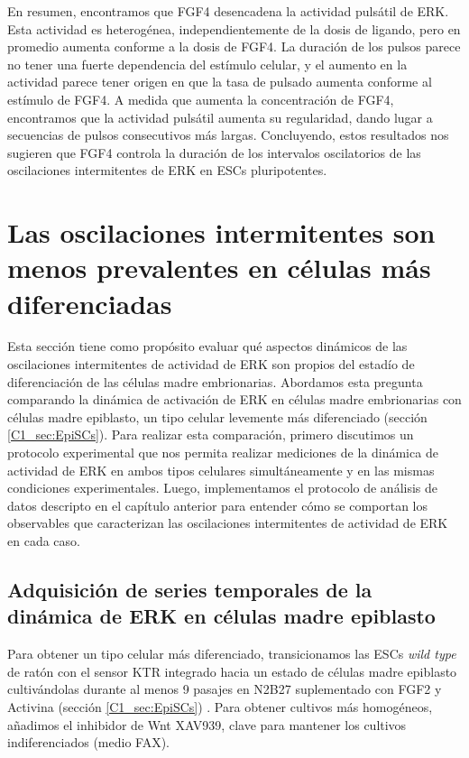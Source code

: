 \documentclass[./main.tex]{subfiles}
\begin{document}
En resumen, encontramos que FGF4 desencadena la actividad pulsátil de ERK. Esta actividad es heterogénea, independientemente de la dosis de ligando, pero en promedio aumenta conforme a la dosis de FGF4. La duración de los pulsos parece no tener una fuerte dependencia del estímulo celular, y el aumento en la actividad parece tener origen en que la tasa de pulsado aumenta conforme al estímulo de FGF4. A medida que aumenta la concentración de FGF4, encontramos que la actividad pulsátil aumenta su regularidad, dando lugar a secuencias de pulsos consecutivos más largas. Concluyendo, estos resultados nos sugieren que FGF4 controla la duración de los intervalos oscilatorios de las oscilaciones intermitentes de ERK en ESCs pluripotentes.


\section{Las oscilaciones intermitentes son menos prevalentes en células más diferenciadas}

Esta sección tiene como propósito evaluar qué aspectos dinámicos de las oscilaciones intermitentes de actividad de ERK son propios del estadío de diferenciación de las células madre embrionarias. Abordamos esta pregunta comparando la dinámica de activación de ERK en células madre embrionarias con células madre epiblasto, un tipo celular levemente más diferenciado (sección \ref{C1_sec:EpiSCs}). Para realizar esta comparación, primero discutimos un protocolo experimental que nos permita realizar mediciones de la dinámica de actividad de ERK en ambos tipos celulares simultáneamente y en las mismas condiciones experimentales. Luego, implementamos el protocolo de análisis de datos descripto en el capítulo anterior para entender cómo se comportan los observables que caracterizan las oscilaciones intermitentes de actividad de ERK en cada caso. 


\subsection{Adquisición de series temporales de la dinámica de ERK en células madre epiblasto}

Para obtener un tipo celular más diferenciado, transicionamos las ESCs \textit{wild type} de ratón con el sensor KTR integrado hacia un estado de células madre epiblasto cultivándolas durante al menos 9 pasajes en N2B27 suplementado con FGF2 y Activina (sección \ref{C1_sec:EpiSCs}) \cite{Guo2009}. Para obtener cultivos más homogéneos, añadimos el inhibidor de Wnt XAV939, clave para mantener los cultivos indiferenciados (medio FAX).
\end{document}
